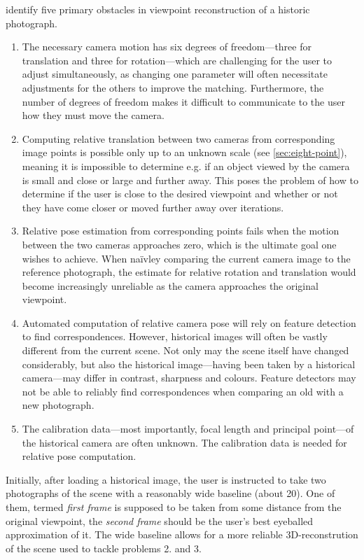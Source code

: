 \citet*{bae2010} identify five primary obstacles in viewpoint reconstruction of a
historic photograph.
\begin{enumerate}
   \item The necessary camera motion has six degrees of freedom---three for
      translation and three for rotation---which are challenging for the user
      to adjust simultaneously, as changing one parameter will often necessitate
      adjustments for the others to improve the matching. Furthermore, the
      number of degrees of freedom makes it difficult to communicate to the
      user how they must move the camera.
   \item Computing relative translation between two cameras from corresponding
      image points is possible only up to an unknown scale (see
      \autoref{sec:eight-point}), meaning it is impossible to
      determine e.g. if an object viewed by the camera is small and close or
      large and further away. This poses the problem of how to determine if the
      user is close to the desired viewpoint and whether or not they have come
      closer or moved further away over iterations. 
   \item Relative pose estimation from corresponding points fails when the
      motion between the two cameras approaches zero, which is the ultimate goal
      one wishes to achieve. When na\"ivley comparing the current camera image
      to the reference photograph, the estimate for relative rotation and
      translation would become increasingly unreliable as the camera approaches the
      original viewpoint.
   \item Automated computation of relative camera pose will rely on feature
      detection to find correspondences. However, historical images will often
      be vastly different from the current scene. Not only may the scene itself
      have changed considerably, but also the historical image---having been
      taken by a historical camera---may differ in contrast, sharpness and
      colours. Feature detectors may not be able to reliably find
      correspondences when comparing an old with a new photograph.
   \item The calibration data---most importantly, focal length and principal
      point---of the historical camera are often unknown. The calibration data
      is needed for relative pose computation.
\end{enumerate}

Initially, after loading a historical image, the user is instructed to
take two photographs of the scene with a reasonably wide baseline (about
20\textdegree). One of them, termed \emph{first frame} is supposed to be
taken from some distance from the original viewpoint, the \emph{second
frame} should be the user's best eyeballed approximation of it. The wide
baseline allows for a more reliable 3D-reconstrution of the scene used to
tackle problems 2. and 3. 

